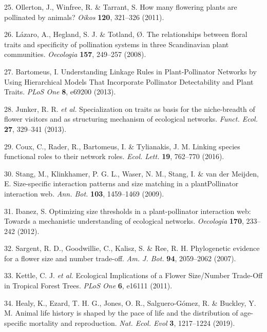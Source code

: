 \documentclass[12pt,a4paper,]{article}
\begin{document}
\hypertarget{ref-ollerton2011}{}
25. Ollerton, J., Winfree, R. \& Tarrant, S. How many flowering plants
are pollinated by animals? \emph{Oikos} \textbf{120}, 321--326 (2011).

\hypertarget{ref-lazaro2008}{}
26. Lázaro, A., Hegland, S. J. \& Totland, Ø. The relationships between
floral traits and specificity of pollination systems in three
Scandinavian plant communities. \emph{Oecologia} \textbf{157}, 249--257
(2008).

\hypertarget{ref-bartomeus2013}{}
27. Bartomeus, I. Understanding Linkage Rules in Plant-Pollinator
Networks by Using Hierarchical Models That Incorporate Pollinator
Detectability and Plant Traits. \emph{PLoS One} \textbf{8}, e69200
(2013).

\hypertarget{ref-junker2013}{}
28. Junker, R. R. \emph{et al.} Specialization on traits as basis for
the niche-breadth of flower visitors and as structuring mechanism of
ecological networks. \emph{Funct. Ecol.} \textbf{27}, 329--341 (2013).

\hypertarget{ref-coux2016}{}
29. Coux, C., Rader, R., Bartomeus, I. \& Tylianakis, J. M. Linking
species functional roles to their network roles. \emph{Ecol. Lett.}
\textbf{19}, 762--770 (2016).

\hypertarget{ref-stang2009}{}
30. Stang, M., Klinkhamer, P. G. L., Waser, N. M., Stang, I. \& van der
Meijden, E. Size-specific interaction patterns and size matching in a
plantPollinator interaction web. \emph{Ann. Bot.} \textbf{103},
1459--1469 (2009).

\hypertarget{ref-ibanez2012}{}
31. Ibanez, S. Optimizing size thresholds in a plant-pollinator
interaction web: Towards a mechanistic understanding of ecological
networks. \emph{Oecologia} \textbf{170}, 233--242 (2012).

\hypertarget{ref-sargent2007}{}
32. Sargent, R. D., Goodwillie, C., Kalisz, S. \& Ree, R. H.
Phylogenetic evidence for a flower size and number trade-off. \emph{Am.
J. Bot.} \textbf{94}, 2059--2062 (2007).

\hypertarget{ref-kettle2011}{}
33. Kettle, C. J. \emph{et al.} Ecological Implications of a Flower
Size/Number Trade-Off in Tropical Forest Trees. \emph{PLoS One}
\textbf{6}, e16111 (2011).

\hypertarget{ref-healy2019}{}
34. Healy, K., Ezard, T. H. G., Jones, O. R., Salguero-Gómez, R. \&
Buckley, Y. M. Animal life history is shaped by the pace of life and the
distribution of age-specific mortality and reproduction. \emph{Nat.
Ecol. Evol} \textbf{3}, 1217--1224 (2019).
\end{document}

